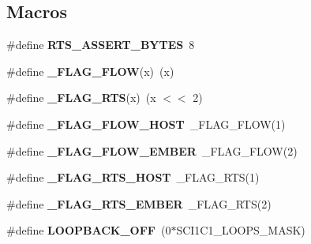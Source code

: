 \subsection*{Macros}
\begin{DoxyCompactItemize}
\item 
\hypertarget{group__hal__hcs08_ga7c3a985c27600619d2bc4db511aff598}{\#define {\bfseries R\-T\-S\-\_\-\-A\-S\-S\-E\-R\-T\-\_\-\-B\-Y\-T\-E\-S}~8}\label{group__hal__hcs08_ga7c3a985c27600619d2bc4db511aff598}

\item 
\hypertarget{group__hal__hcs08_ga4014e6eec5520cf4a6ef76ead07fb7ee}{\#define {\bfseries \-\_\-\-F\-L\-A\-G\-\_\-\-F\-L\-O\-W}(x)~(x)}\label{group__hal__hcs08_ga4014e6eec5520cf4a6ef76ead07fb7ee}

\item 
\hypertarget{group__hal__hcs08_ga1ffa0bde2db555fdfc6d8c1e076751a6}{\#define {\bfseries \-\_\-\-F\-L\-A\-G\-\_\-\-R\-T\-S}(x)~(x $<$$<$ 2)}\label{group__hal__hcs08_ga1ffa0bde2db555fdfc6d8c1e076751a6}

\item 
\hypertarget{group__hal__hcs08_gad4a243237dcc9407b96ff3ee542af5e0}{\#define {\bfseries \-\_\-\-F\-L\-A\-G\-\_\-\-F\-L\-O\-W\-\_\-\-H\-O\-S\-T}~\-\_\-\-F\-L\-A\-G\-\_\-\-F\-L\-O\-W(1)}\label{group__hal__hcs08_gad4a243237dcc9407b96ff3ee542af5e0}

\item 
\hypertarget{group__hal__hcs08_ga1e9912dd7658dc97935822d8558379f0}{\#define {\bfseries \-\_\-\-F\-L\-A\-G\-\_\-\-F\-L\-O\-W\-\_\-\-E\-M\-B\-E\-R}~\-\_\-\-F\-L\-A\-G\-\_\-\-F\-L\-O\-W(2)}\label{group__hal__hcs08_ga1e9912dd7658dc97935822d8558379f0}

\item 
\hypertarget{group__hal__hcs08_ga0e794f88b0b3a3936752efbfc6ca18db}{\#define {\bfseries \-\_\-\-F\-L\-A\-G\-\_\-\-R\-T\-S\-\_\-\-H\-O\-S\-T}~\-\_\-\-F\-L\-A\-G\-\_\-\-R\-T\-S(1)}\label{group__hal__hcs08_ga0e794f88b0b3a3936752efbfc6ca18db}

\item 
\hypertarget{group__hal__hcs08_ga9ba3c976fe95439424c64615bbb17f3f}{\#define {\bfseries \-\_\-\-F\-L\-A\-G\-\_\-\-R\-T\-S\-\_\-\-E\-M\-B\-E\-R}~\-\_\-\-F\-L\-A\-G\-\_\-\-R\-T\-S(2)}\label{group__hal__hcs08_ga9ba3c976fe95439424c64615bbb17f3f}

\item 
\hypertarget{group__hal__hcs08_ga08e617305a992b712a63f4da735ceb00}{\#define {\bfseries L\-O\-O\-P\-B\-A\-C\-K\-\_\-\-O\-F\-F}~(0$\ast$S\-C\-I1\-C1\-\_\-\-L\-O\-O\-P\-S\-\_\-\-M\-A\-S\-K)}\label{group__hal__hcs08_ga08e617305a992b712a63f4da735ceb00}


\end{DoxyCompactItemize}
